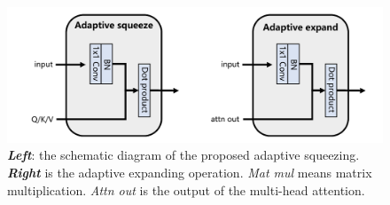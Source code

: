 \begin{figure}[tb]
  \centering
   \includegraphics[width=0.8\hsize]{adaptive_sqeeze.pdf}
  \caption{\textit{\textbf{Left}}: the schematic diagram of the proposed adaptive squeezing.
  \textit{\textbf{Right}} is the adaptive expanding operation. \textit{Mat mul} means matrix multiplication. \textit{Attn out} is the output of the multi-head attention.
  }
  \label{fig:squeeze_expand}
\end{figure}